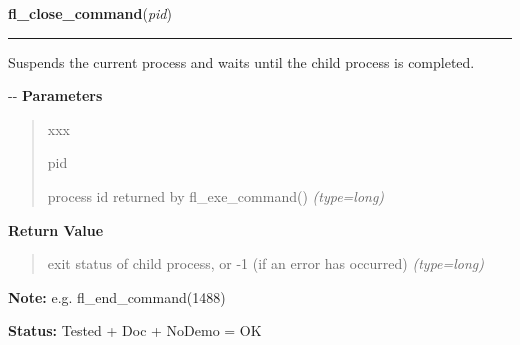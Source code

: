 \hspace{.8\funcindent}\begin{boxedminipage}{\funcwidth}

    \raggedright \textbf{fl\_close\_command}(\textit{pid})

    \vspace{-1.5ex}

    \rule{\textwidth}{0.5\fboxrule}
\setlength{\parskip}{2ex}

Suspends the current process and waits until the child process is
completed.

-{}-
\setlength{\parskip}{1ex}
      \textbf{Parameters}
      \vspace{-1ex}

      \begin{quote}
        \begin{Ventry}{xxx}

          \item[pid]


process id returned by fl\_exe\_command()
            {\it (type=long)}

        \end{Ventry}

      \end{quote}

      \textbf{Return Value}
    \vspace{-1ex}

      \begin{quote}

exit status of child process, or -1 (if an error has occurred)
      {\it (type=long)}

      \end{quote}

\textbf{Note:} 
e.g. fl\_end\_command(1488)


\textbf{Status:} 
Tested + Doc + NoDemo = OK


    \end{boxedminipage}

    \label{xformslib:flgoodies:fl_check_command}

    \vspace{0.5ex}

